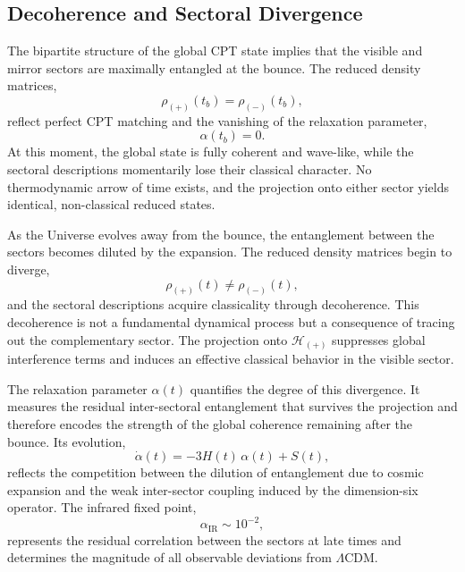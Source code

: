 \documentclass[11pt,a4paper]{article}
\begin{document}
\subsection{Decoherence and Sectoral Divergence}

The bipartite structure of the global CPT state implies that the visible and mirror sectors are
maximally entangled at the bounce. The reduced density matrices,
\begin{equation}
    \rho_{(+)}(t_b) = \rho_{(-)}(t_b),
\end{equation}
reflect perfect CPT matching and the vanishing of the relaxation parameter,
\begin{equation}
    \alpha(t_b) = 0.
\end{equation}
At this moment, the global state is fully coherent and wave-like, while the sectoral descriptions
momentarily lose their classical character. No thermodynamic arrow of time exists, and the
projection onto either sector yields identical, non-classical reduced states.

As the Universe evolves away from the bounce, the entanglement between the sectors becomes
diluted by the expansion. The reduced density matrices begin to diverge,
\begin{equation}
    \rho_{(+)}(t) \neq \rho_{(-)}(t),
\end{equation}
and the sectoral descriptions acquire classicality through decoherence. This decoherence is not
a fundamental dynamical process but a consequence of tracing out the complementary sector.
The projection onto $\mathcal{H}_{(+)}$ suppresses global interference terms and induces an effective
classical behavior in the visible sector.

The relaxation parameter $\alpha(t)$ quantifies the degree of this divergence. It measures the
residual inter-sectoral entanglement that survives the projection and therefore encodes the
strength of the global coherence remaining after the bounce. Its evolution,
\begin{equation}
    \dot{\alpha}(t) = -3H(t)\,\alpha(t) + S(t),
\end{equation}
reflects the competition between the dilution of entanglement due to cosmic expansion and the
weak inter-sector coupling induced by the dimension-six operator. The infrared fixed point,
\begin{equation}
    \alpha_{\mathrm{IR}} \sim 10^{-2},
\end{equation}
represents the residual correlation between the sectors at late times and determines the magnitude
of all observable deviations from $\Lambda$CDM.
\end{document}
